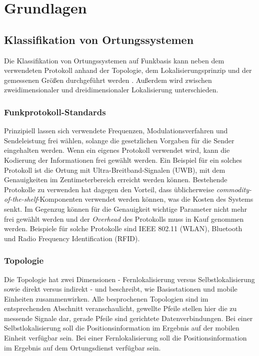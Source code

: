 \chapter{Grundlagen}
\label{ch:Grundlagen}

\section{Klassifikation von Ortungssystemen}
\label{ch:Einleitung:sec:Ortungssysteme}
Die Klassifikation von Ortungssystemen auf Funkbasis kann neben dem verwendeten Protokoll anhand der Topologie, dem Lokalisierungsprinzip und der gemessenen Größen durchgeführt werden \cite{liu2007survey}.
Außerdem wird zwischen zweidimensionaler und dreidimensionaler Lokalisierung unterschieden.

\subsection{Funkprotokoll-Standards}
Prinzipiell lassen sich verwendete Frequenzen, Modulationsverfahren und Sendeleistung frei wählen, solange die gesetzlichen Vorgaben für die Sender eingehalten werden. Wenn ein eigenes Protokoll verwendet wird, kann die Kodierung der Informationen frei gewählt werden.
Ein Beispiel für ein solches Protokoll ist die Ortung mit Ultra-Breitband-Signalen (UWB), mit dem Genauigkeiten im Zentimeterbereich erreicht werden können. Bestehende Protokolle zu verwenden hat dagegen den Vorteil, dass üblicherweise \emph{commodity-of-the-shelf}-Komponenten verwendet werden können, was die Kosten des Systems senkt. Im Gegenzug können für die Genauigkeit wichtige Parameter nicht mehr frei gewählt werden und der \emph{Overhead} des Protokolls muss in Kauf genommen werden. Beispiele für solche Protokolle sind IEEE 802.11 (WLAN), Bluetooth und Radio Frequency Identification (RFID).

\subsection{Topologie}
Die Topologie hat zwei Dimensionen - Fernlokalisierung versus Selbstlokalisierung sowie direkt versus indirekt - und beschreibt, wie Basisstationen und mobile Einheiten zusammenwirken.
Alle besprochenen Topologien sind im entsprechenden Abschnitt veranschaulicht, gewellte Pfeile stellen hier die zu messende Signale dar, gerade Pfeile sind gerichtete Datenverbindungen.
Bei einer Selbstlokalisierung soll die Positionsinformation im Ergebnis auf der mobilen Einheit verfügbar sein.
Bei einer Fernlokalisierung soll die Positionsinformation im Ergebnis auf dem Ortungsdienst verfügbar sein.


